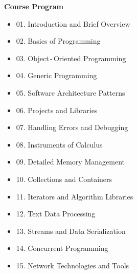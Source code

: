 \documentclass{beamer}
\begin{document}
\begin{frame}{\bf Course Program}

{\footnotesize

    \begin{itemize}

        \setlength\itemsep{0.1em}

        \item 01. Introduction and Brief Overview
    
        \item 02. Basics of Programming
    
        \item 03. Object\,-\,Oriented Programming
    
        \item 04. Generic Programming
    
        \item 05. Software Architecture Patterns
    
        \item 06. Projects and Libraries
    
        \item 07. Handling Errors and Debugging
    
        \item 08. Instruments of Calculus
    
        \item 09. Detailed Memory Management
    
        \item 10. Collections and Containers
    
        \item 11. Iterators and Algorithm Libraries
    
        \item 12. Text Data Processing
    
        \item 13. Streams and Data Serialization
    
        \item 14. Concurrent Programming
    
        \item 15. Network Technologies and Tools
        
    \end{itemize}
    
}

\end{frame}
\end{document}
